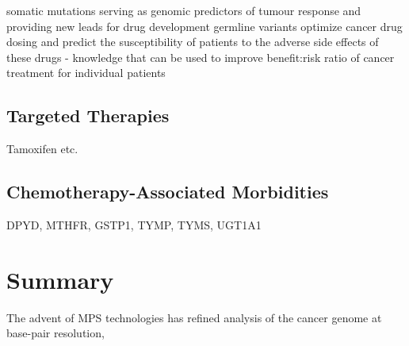 somatic mutations serving as genomic predictors of tumour response and providing new leads for drug development
germline variants optimize cancer drug dosing and predict the susceptibility of patients to the adverse side effects of these drugs - knowledge that can be used to improve benefit:risk ratio of cancer treatment for individual patients

\subsection{Targeted Therapies}
Tamoxifen etc.

\subsection{Chemotherapy-Associated Morbidities}
DPYD, MTHFR, GSTP1, TYMP, TYMS, UGT1A1

\section{Summary}
\label{sec:Summary}

The advent of MPS technologies has refined analysis of the cancer genome at base-pair resolution,

\endinput

Key words: pharmacogenomic, germline variants, targeted amplicon-based MPS panel, formalin artifacts, tumour-only genomic profiling, patient care, treatment outcome, treatment response, risk stratification, susceptibility, toxicity, adverse drug events

--

Cancer initiation and progression are driven by accumulation of genomic and epigenomic alterations that confer selective growth advantages to cells. The advent of MPS technologies has revolutionized cancer genomics research by enabling collective efforts such as TCGA and the ICGC to characterize the genomic architectures of a growing number of tumours. A central recognition from these studies is that cancer is a complex and heterogenous disease, with mutational burdens that vary between tumour types, from 0.28 to 8.15 mutations per megabase in acute myeloid leukemia (AML) and lung squamous carcinoma, respectively. Most cancers typically accumulate an array of mutated genes that interact over time to initiate neoplasia and fuel its progression.

more cancer genes, more than one driver gene

